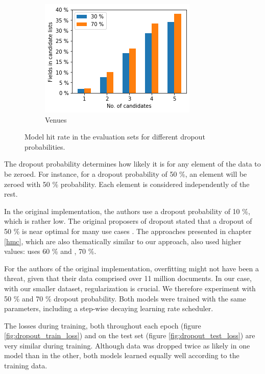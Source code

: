 \begin{figure}
\begin{subfigure}[t]{.32\textwidth}
    \includegraphics[width=\textwidth]{figures/supervised_approach/dropout_venue.png}
    \caption{Venues}
    \label{fig:dropout_venue}
  \end{subfigure}
  \caption{Model hit rate in the evaluation sets for different dropout probabilities.}
  \label{fig:dropout_eval}
\end{figure}

The dropout probability determines how likely it is for any element of the data to be zeroed. For instance, for a dropout probability of 50 \%, an element will be zeroed with 50 \% probability. Each element is considered independently of the rest.

In the original implementation, the authors use a dropout probability of 10 \%, which is rather low. The original proposers of dropout stated that a dropout of 50 \% is near optimal for many use cases \cite{srivastava2014dropout}. The approaches presented in chapter \ref{hmc}, which are also thematically similar to our approach, also used higher values: \cite{wehrmann2018hierarchical} uses 60 \% and \cite{giunchiglia2020coherent}, 70 \%.

For the authors of the original implementation, overfitting might not have been a threat, given that their data comprised over 11 million documents. In our case, with our smaller dataset, regularization is crucial. We therefore experiment with 50 \% and 70 \% dropout probability. Both models were trained with the same parameters, including a step-wise decaying learning rate scheduler. 

The losses during training, both throughout each epoch (figure \ref{fig:dropout_train_loss}) and on the test set (figure \ref{fig:dropout_test_loss}) are very similar during training. Although data was dropped twice as likely in one model than in the other, both models learned equally well according to the training data.


